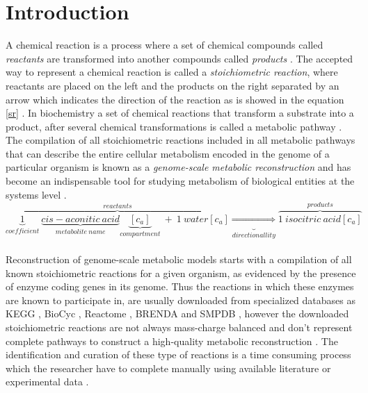 \section{Introduction}
A chemical reaction is a process where a set of chemical compounds called \emph{reactants} are transformed into another compounds called \emph{products} \cite{Chen2013}. The accepted way to represent a chemical reaction is called a \emph{stoichiometric reaction}, where reactants are placed on the left and the products on the right separated by an arrow which indicates the direction of the reaction as is showed in the equation \ref{sr} \cite{Hendrickson1997}. In biochemistry a set of chemical reactions that transform a substrate into a product, after several chemical transformations is called a metabolic pathway \cite{Lambert2011}. The compilation of all stoichiometric reactions included in all metabolic pathways that can describe the entire cellular metabolism encoded in the genome of a particular organism is known as a \emph{genome-scale metabolic reconstruction} \cite{Park2009} and has become an indispensable tool for studying metabolism of biological entities at the systems level \cite{Thiele2010}.\\

\begin{equation}
\label{sr}
\overbrace{\underbrace{1}_{coefficient}\ \underbrace{cis-aconitic\ acid}_{metabolite\ name}\underbrace{[c_a]}_{compartment}\ +\ 1\ water[c_a]}^{reactants} \underbrace{\Rightarrow}_{directionallity} \overbrace{1\ isocitric\ acid[c_a]}^{products}
\end{equation}\\

Reconstruction of genome-scale metabolic models starts with a compilation of all known stoichiometric reactions for a given organism, as evidenced by the presence of enzyme coding genes in its genome. Thus the reactions in which these enzymes are known to  participate in, are usually downloaded from specialized databases as KEGG \cite{Kanehisa2000}, BioCyc \cite{Caspi2014}, Reactome \cite{Croft2014}, BRENDA \cite{Chang2015} and SMPDB \cite{Jewison2014}, however the downloaded stoichiometric reactions are not always mass-charge balanced and don't represent complete pathways to construct a high-quality metabolic reconstruction \cite{Thiele2010, Gevorgyan2008}. The identification and curation of these type of reactions is a time consuming process which  the researcher have to complete manually using available literature or experimental data \cite{Lakshmanan2014}.\\

